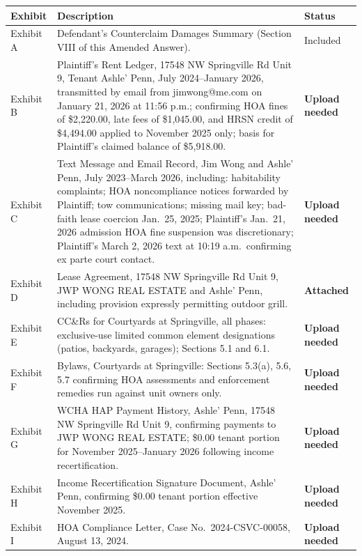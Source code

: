 \documentclass[12pt,letterpaper]{article}
\begin{document}
\begin{singlespace}
\vspace{8pt}
\noindent\begin{longtable}{|p{0.7in}|p{4.8in}|p{0.7in}|}
\hline
\textbf{Exhibit} & \textbf{Description} & \textbf{Status} \\
\hline
Exhibit A & Defendant's Counterclaim Damages Summary (Section VIII of this Amended Answer). & Included \\
\hline
Exhibit B & Plaintiff's Rent Ledger, 17548 NW Springville Rd Unit 9, Tenant Ashle' Penn, July 2024--January 2026, transmitted by email from jimwong@me.com on January 21, 2026 at 11:56 p.m.; confirming HOA fines of \$2,220.00, late fees of \$1,045.00, and HRSN credit of \$4,494.00 applied to November 2025 only; basis for Plaintiff's claimed balance of \$5,918.00. & \textbf{Upload needed} \\
\hline
Exhibit C & Text Message and Email Record, Jim Wong and Ashle' Penn, July 2023--March 2026, including: habitability complaints; HOA noncompliance notices forwarded by Plaintiff; tow communications; missing mail key; bad-faith lease coercion Jan.\ 25, 2025; Plaintiff's Jan.\ 21, 2026 admission HOA fine suspension was discretionary; Plaintiff's March 2, 2026 text at 10:19 a.m.\ confirming ex parte court contact. & \textbf{Upload needed} \\
\hline
Exhibit D & Lease Agreement, 17548 NW Springville Rd Unit 9, JWP WONG REAL ESTATE and Ashle' Penn, including provision expressly permitting outdoor grill. & \textbf{Attached} \\
\hline
Exhibit E & CC\&Rs for Courtyards at Springville, all phases: exclusive-use limited common element designations (patios, backyards, garages); Sections 5.1 and 6.1. & \textbf{Upload needed} \\
\hline
Exhibit F & Bylaws, Courtyards at Springville: Sections 5.3(a), 5.6, 5.7 confirming HOA assessments and enforcement remedies run against unit owners only. & \textbf{Upload needed} \\
\hline
Exhibit G & WCHA HAP Payment History, Ashle' Penn, 17548 NW Springville Rd Unit 9, confirming payments to JWP WONG REAL ESTATE; \$0.00 tenant portion for November 2025--January 2026 following income recertification. & \textbf{Upload needed} \\
\hline
Exhibit H & Income Recertification Signature Document, Ashle' Penn, confirming \$0.00 tenant portion effective November 2025. & \textbf{Upload needed} \\
\hline
Exhibit I & HOA Compliance Letter, Case No.\ 2024-CSVC-00058, August 13, 2024. & \textbf{Upload needed} \\

\end{longtable}
\end{singlespace}
\end{document}
